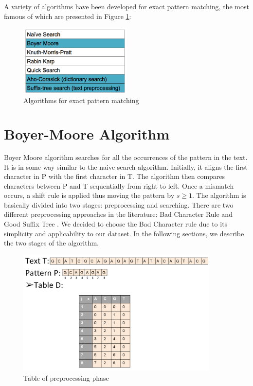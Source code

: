 \documentclass[paper=a4, fontsize=11pt]{scrartcl} %
\numberwithin{equation}{section} %
\numberwithin{figure}{section} %
\numberwithin{table}{section} %
\begin{document}
A variety of algorithms have been developed for exact pattern matching, the most famous of which are presented in Figure \ref{algorithms}:

\begin{figure}[h!]
\centering
\includegraphics[width=0.5\textwidth]{figures/algorithms.png}
\caption{Algorithms for exact pattern matching}
\label{algorithms}
\end{figure}

\newpage

\section{Boyer-Moore Algorithm}
Boyer Moore algorithm \cite{bm_fast} searches for all the occurrences of the pattern in the text. It is in some way similar to the naive search algorithm. Initially, it aligns the first character in P with the first character in T. The algorithm then compares characters between P and T sequentially from right to left. Once a mismatch occurs, a shift rule is applied thus moving the pattern by $s\ge 1$. The algorithm is basically divided into two stages: preprocessing and searching. There are two different preprocessing approaches in the literature: Bad Character Rule and Good Suffix Tree \cite{bm_tbc}. We decided to choose the Bad Character rule due to its simplicity and applicability to our dataset. In the following sections, we describe the two stages of the algorithm.


\begin{figure}[h!]
\centering
\includegraphics[width=0.9\textwidth]{figures/Example_Table.png}
\caption{Table of preprocessing phase}
\label{fig:table}
\end{figure}
\end{document}
